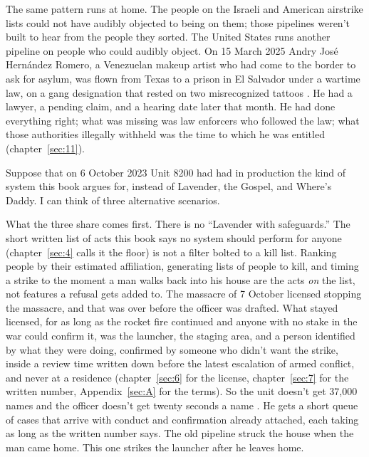 The same pattern runs at home. The people on the Israeli and American airstrike lists could not have audibly objected to being on them; those pipelines weren't built to hear from the people they sorted. The United States runs another pipeline on people who could audibly object. On 15 March 2025 Andry José Hernández Romero, a Venezuelan makeup artist who had come to the border to ask for asylum, was flown from Texas to a prison in El Salvador under a wartime law, on a gang designation that rested on two misrecognized tattoos \autocite{Palomera2025Blade,LULAC2025HernandezRomero}. He had a lawyer, a pending claim, and a hearing date later that month. He had done everything right; what was missing was law enforcers who followed the law; what those authorities illegally withheld was the time to which he was entitled (chapter~\ref{sec:11}).


Suppose that on 6 October 2023 Unit 8200 had had in production the kind of system this book argues for, instead of Lavender, the Gospel, and Where's Daddy. I can think of three alternative scenarios.

What the three share comes first. There is no “Lavender with safeguards.” The short written list of acts this book says no system should perform for anyone (chapter~\ref{sec:4} calls it the floor) is not a filter bolted to a kill list. Ranking people by their estimated affiliation, generating lists of people to kill, and timing a strike to the moment a man walks back into his house are the acts \emph{on} the list, not features a refusal gets added to. The massacre of 7 October licensed stopping the massacre, and that was over before the officer was drafted. What stayed licensed, for as long as the rocket fire continued and anyone with no stake in the war could confirm it, was the launcher, the staging area, and a person identified by what they were doing, confirmed by someone who didn't want the strike, inside a review time written down before the latest escalation of armed conflict, and never at a residence (chapter~\ref{sec:6} for the license, chapter~\ref{sec:7} for the written number, Appendix~\ref{sec:A} for the terms). So the unit doesn't get 37,000 names and the officer doesn't get twenty seconds a name \autocite{abraham2024lavender}. He gets a short queue of cases that arrive with conduct and confirmation already attached, each taking as long as the written number says. The old pipeline struck the house when the man came home. This one strikes the launcher after he leaves home.

